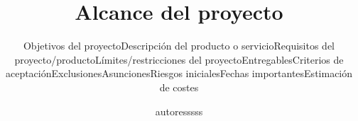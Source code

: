 \documentclass[a4paper,10pt]{article}
\title{Alcance del proyecto}
\author{autoresssss}
\begin{document}
\maketitle

\subtitle{Objetivos del proyecto}

\subtitle{Descripción del producto o servicio}

\subtitle{Requisitos del proyecto/producto}

\subtitle{Límites/restricciones del proyecto}

\subtitle{Entregables}

\subtitle{Criterios de aceptación}

\subtitle{Exclusiones}

\subtitle{Asunciones}

\subtitle{Riesgos iniciales}

\subtitle{Fechas importantes}

\subtitle{Estimación de costes}



\end{document}
